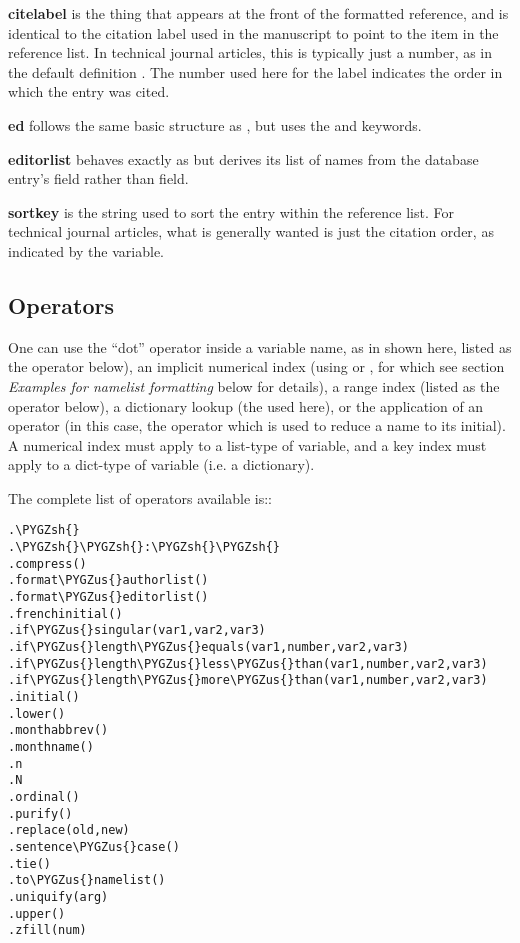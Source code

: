 \documentclass[letterpaper,10pt,english]{sphinxmanual}
\def\PYGZus{\char`\_}
\def\PYGZsh{\char`\#}
\begin{document}
\textbf{citelabel} is the thing that appears at the front of the formatted reference, and is identical to the citation label used in the manuscript to point to the item in the reference list. In technical journal articles, this is typically just a number, as in the default definition . The number used here for the label indicates the order in which the entry was cited.

\textbf{ed} follows the same basic structure as , but uses the  and  keywords.

\textbf{editorlist} behaves exactly as  but derives its list of names from the database entry's  field rather than  field.

\textbf{sortkey} is the string used to sort the entry within the reference list. For technical journal articles, what is generally wanted is just the citation order, as indicated by the  variable.


\subsection{Operators}
\label{guidelines_for_writing_style_templates:operators}
One can use the ``dot'' operator inside a variable name, as in  shown here, listed as the  operator below), an implicit numerical index (using  or , for which see section \emph{Examples for namelist formatting} below for details), a range index (listed as the \code{\#\#:\#\#} operator below), a dictionary lookup (the  used here), or the application of an operator (in this case, the  operator which is used to reduce a name to its initial). A numerical index must apply to a list-type of variable, and a key index must apply to a dict-type of variable (i.e. a dictionary).

The complete list of operators available is::

\begin{Verbatim}[commandchars=\\\{\}]
.\PYGZsh{}
.\PYGZsh{}\PYGZsh{}:\PYGZsh{}\PYGZsh{}
.compress()
.format\PYGZus{}authorlist()
.format\PYGZus{}editorlist()
.frenchinitial()
.if\PYGZus{}singular(var1,var2,var3)
.if\PYGZus{}length\PYGZus{}equals(var1,number,var2,var3)
.if\PYGZus{}length\PYGZus{}less\PYGZus{}than(var1,number,var2,var3)
.if\PYGZus{}length\PYGZus{}more\PYGZus{}than(var1,number,var2,var3)
.initial()
.lower()
.monthabbrev()
.monthname()
.n
.N
.ordinal()
.purify()
.replace(old,new)
.sentence\PYGZus{}case()
.tie()
.to\PYGZus{}namelist()
.uniquify(arg)
.upper()
.zfill(num)
\end{Verbatim}
\end{document}
